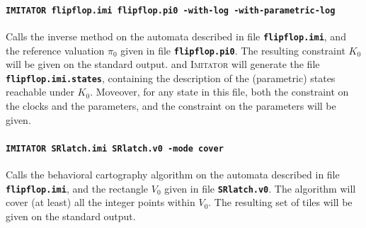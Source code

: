 \documentclass[a4paper,11pt]{article}
\newcommand{\imitator}{\textsc{Imitator}}
\newcommand{\imitatorExec}{\code{IMITATOR}}
\newcommand{\code}[1]{\textbf{\texttt{#1}}}
\begin{document}


\paragraph{\code{\imitatorExec{} flipflop.imi flipflop.pi0 -with-log -with-parametric-log}}
Calls the inverse method on the automata described in file \code{flipflop.imi}, and the reference valuation $\pi_0$ given in file \code{flipflop.pi0}.
The resulting constraint $K_0$ will be given on the standard output.
and \imitator{} will generate the file \code{flipflop.imi.states}, containing the description of the (parametric) states reachable under $K_0$.
Moveover, for any state in this file, both the constraint on the clocks and the parameters, and the constraint on the parameters will be given.


\paragraph{\code{\imitatorExec{} SRlatch.imi SRlatch.v0 -mode cover}}
Calls the behavioral cartography algorithm on the automata described in file \code{flipflop.imi}, and the rectangle $V_0$ given in file \code{SRlatch.v0}.
The algorithm will cover (at least) all the integer points within $V_0$.
The resulting set of tiles will be given on the standard output.


\end{document}
